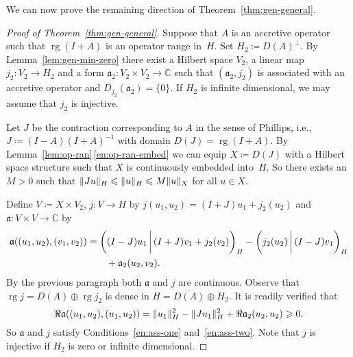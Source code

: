 \documentclass[a4paper,oneside,12pt]{amsart}
\theoremstyle{plain}
\theoremstyle{definition}
\let\le=\leqslant
\let\ge=\geqslant
\DeclarePairedDelimiter\norm{\lVert}{\rVert}
\begin{document}
We can now prove the remaining direction of Theorem~\ref{thm:gen-general}.
\begin{proof}[Proof of Theorem~\ref{thm:gen-general}]
Suppose that $A$ is an accretive operator such that $\operatorname{rg}(I+A)$ is an operator range in~$H$.
Set $H_2\coloneqq D(A)^\perp$. By Lemma~\ref{lem:gen-min-zero} there exist a Hilbert space $V_2$, a linear map $j_2\colon V_2\to H_2$ and a form ${{\mathfrak{{a}}}}_2\colon V_2\times V_2\to{\mathbb{C}}$
such that $({{\mathfrak{{a}}}}_2,j_2)$ is associated with an accretive operator and $D_{j_2}({{\mathfrak{{a}}}}_2)=\{0\}$.
If $H_2$ is infinite dimensional, we may assume that $j_2$ is injective.

Let $J$ be the contraction corresponding to $A$ in the sense of Phillips, i.e., $J\coloneqq (I-A)(I+A)^{-1}$ with domain $D(J)=\operatorname{rg}(I+A)$.
By Lemma~\ref{lem:op-ran}\,\ref{en:op-ran-embed} we can equip $X\coloneqq D(J)$ with a Hilbert space structure such that $X$ is continuously embedded into~$H$.
So there exists an $M>0$ such that $\norm{Ju}_H\le \norm{u}_H\le M\norm{u}_{X}$ for all $u\in X$. 

Define $V\coloneqq X\times V_2$, $j\colon V\to H$ by $j(u_1,u_2)=(I+J)u_1+j_2(u_2)$ and ${{\mathfrak{{a}}}}\colon V\times V\to{\mathbb{C}}$ by
\begin{align*}
    {{\mathfrak{{a}}}}((u_1,u_2),(v_1,v_2)) &= {{\ifthenelse{\equal{auto}{auto}}{\left({(I-J)u_1}\mkern3mu{\biggm|}\mkern3mu {(I+J)v_1+j_2(v_2)}\right)}{}
\ifthenelse{\equal{auto}{b}}{\bigl({(I-J)u_1}\mkern3mu{\biggm|}\mkern3mu {(I+J)v_1+j_2(v_2)}\bigr)}{}
\ifthenelse{\equal{auto}{B}}{\Bigl({(I-J)u_1}\mkern3mu{\bigm|}\mkern3mu {(I+J)v_1+j_2(v_2)}\Bigr)}{}
}}_H - {{\ifthenelse{\equal{auto}{auto}}{\left({j_2(u_2)}\mkern3mu{\biggm|}\mkern3mu {(I-J)v_1}\right)}{}
\ifthenelse{\equal{auto}{b}}{\bigl({j_2(u_2)}\mkern3mu{\biggm|}\mkern3mu {(I-J)v_1}\bigr)}{}
\ifthenelse{\equal{auto}{B}}{\Bigl({j_2(u_2)}\mkern3mu{\bigm|}\mkern3mu {(I-J)v_1}\Bigr)}{}
}}_H \\
                                  &\qquad {}+ {{\mathfrak{{a}}}}_2(u_2,v_2).
\end{align*}
By the previous paragraph both ${{\mathfrak{{a}}}}$ and $j$ are continuous. Observe that $\operatorname{rg} j = D(A)\oplus \operatorname{rg} j_2$ is dense in $H={\overline{{D(A)}}}\oplus H_2$. 
It is readily verified that
\[
    \Re{{\mathfrak{{a}}}}((u_1,u_2),(u_1,u_2))=\norm{u_1}^2_H - \norm{Ju_1}^2_H + \Re{{\mathfrak{{a}}}}_2(u_2,u_2)\ge 0.
\]
So ${{\mathfrak{{a}}}}$ and $j$ satisfy Conditions~\ref{en:ass-one} and~\ref{en:ass-two}.
Note that $j$ is injective if $H_2$ is zero or infinite dimensional.


\end{proof}
\end{document}
